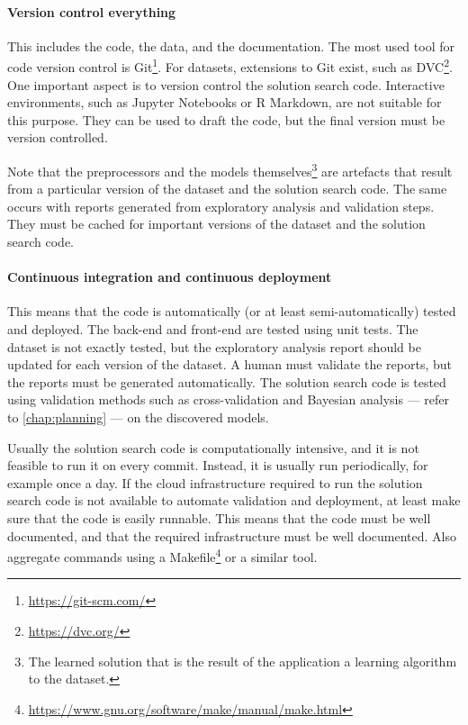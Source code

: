 \paragraph{Version control everything}

This includes the code, the data, and the
documentation. The most used tool for code version control is
Git\footnote{\url{https://git-scm.com/}}.  For datasets,
extensions to Git exist, such as DVC\footnote{\url{https://dvc.org/}}.  One important aspect
is to version control the solution search code.  Interactive environments, such as Jupyter
Notebooks or R Markdown, are not suitable for this purpose.  They can be used to draft the code, but
the final version must be version controlled.

Note that the preprocessors and the models themselves\footnote{The learned
solution that is the result of the application a learning algorithm to the dataset.} are
artefacts that result from a particular version of the dataset and the solution search
code.  The same occurs with reports generated from exploratory analysis and validation
steps.  They must be cached for important versions of the dataset and the solution search
code.

\paragraph{Continuous integration and continuous deployment}


This means that the code is
automatically (or at least semi-automatically) tested and deployed.  The back-end and
front-end are tested using unit tests.  The dataset is not exactly tested, but the
exploratory analysis report should be updated for each version of the dataset.
A human must validate the reports, but the reports must be generated automatically.
The solution search code is tested using
validation methods such as cross-validation and Bayesian analysis --- refer to
\cref{chap:planning} --- on the discovered models.

Usually the solution search code is computationally intensive, and it is
not feasible to run it on every commit.  Instead, it is usually run periodically, for example
once a day.  If the cloud infrastructure required to run the solution search code is not
available to automate validation and deployment, at least make sure that the code is
easily runnable.  This means that the code must be well documented, and that the
required infrastructure must be well documented.  Also aggregate commands using a
Makefile\footnote{\url{https://www.gnu.org/software/make/manual/make.html}} or a similar tool.

